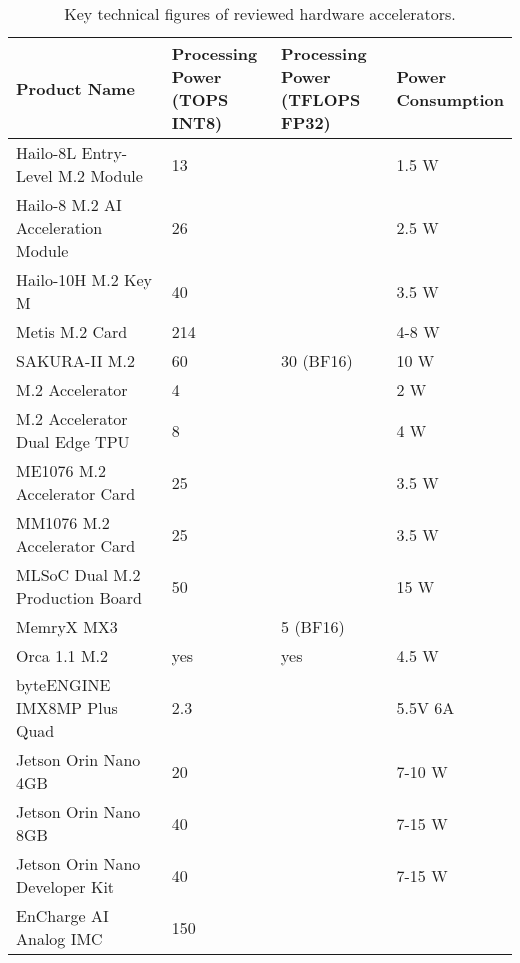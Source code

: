 \begin{table}[!ht]
    \centering
    \begin{tabular}{|l|l|l|l|}
    \hline
        Product Name & \makecell{Processing\\Power\\(TOPS INT8)} & \makecell{Processing\\Power\\(TFLOPS FP32)} & \makecell{Power\\Consumption} \\ \hline
        Hailo-8L Entry-Level M.2 Module & 13 & ~ & 1.5 W \\ \hline
        Hailo-8 M.2 AI Acceleration Module & 26 & ~ & 2.5 W \\ \hline
        Hailo-10H M.2 Key M & 40 & ~ & 3.5 W \\ \hline
        Metis M.2 Card & 214 & ~ & 4-8 W \\ \hline
        SAKURA-II M.2 & 60 & 30 (BF16) & 10 W \\ \hline
        M.2 Accelerator & 4 & ~ & 2 W \\ \hline
        M.2 Accelerator Dual Edge TPU & 8 & ~ & 4 W \\ \hline
        ME1076 M.2 Accelerator Card & 25 & ~ & 3.5 W \\ \hline
        MM1076 M.2 Accelerator Card & 25 & ~ & 3.5 W \\ \hline
        MLSoC Dual M.2 Production Board & 50 & ~ & 15 W \\ \hline
        MemryX MX3 & ~ & 5 (BF16) & ~ \\ \hline
        Orca 1.1 M.2 & yes & yes & 4.5 W \\ \hline
        byteENGINE IMX8MP Plus Quad & 2.3 & ~ & 5.5V 6A \\ \hline
        Jetson Orin Nano 4GB & 20 & ~ & 7-10 W \\ \hline
        Jetson Orin Nano 8GB & 40 & ~ & 7-15 W \\ \hline
        Jetson Orin Nano Developer Kit & 40 & ~ & 7-15 W \\ \hline
        EnCharge AI Analog IMC & 150  & ~ & ~ \\ \hline
    \end{tabular}
    \caption{Key technical figures of reviewed hardware accelerators.}
    \label{tab:market:keyfigures}
\end{table}
